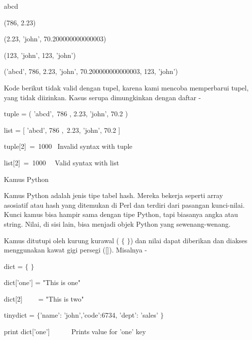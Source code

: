 abcd \par
\noindent 
(786, 2.23) \par
\noindent 
(2.23, 'john', 70.200000000000003) \par
\noindent 
(123, 'john', 123, 'john') \par
\noindent 
('abcd', 786, 2.23, 'john', 70.200000000000003, 123, 'john') \par
\vspace{12pt}
\noindent 
Kode berikut tidak valid dengan tupel, karena kami mencoba memperbarui tupel, yang tidak diizinkan. $  $Kasus serupa dimungkinkan dengan daftar - \par
\vspace{12pt}
\noindent 
tuple = ( 'abcd',~786 , 2.23, 'john', 70.2  ) \par
\noindent 
list = [ 'abcd', 786 ,~2.23, 'john', 70.2  ] \par
\noindent 
tuple[2]~=~1000~    Invalid syntax with tuple \par
\noindent 
list[2]~=~1000~~    Valid syntax with list \par
\vspace{12pt}
\noindent 
Kamus Python \par
\vspace{12pt}
\noindent 
Kamus Python adalah jenis tipe tabel hash. $  $Mereka bekerja seperti array asosiatif atau hash yang ditemukan di Perl dan terdiri dari pasangan kunci-nilai. $  $Kunci kamus bisa hampir sama dengan tipe Python, tapi biasanya angka atau string. $  $Nilai, di sisi lain, bisa menjadi objek Python yang sewenang-wenang. \par
\vspace{12pt}
\noindent 
Kamus ditutupi oleh kurung kurawal ( $  \{  $ $  \}  $) dan nilai dapat diberikan dan diakses menggunakan kawat gigi persegi ([]). $  $Misalnya - \par
\vspace{12pt}
\vspace{12pt}
\noindent 
dict =  $  \{  $ $  \}  $ \par
\noindent 
dict['one'] = "This is one" \par
\noindent 
dict[2]~~~~ = "This is two" \par
\vspace{12pt}
\noindent 
tinydict =  $  \{  $'name': 'john','code':6734, 'dept': 'sales' $  \}  $ \par
\vspace{12pt}
\vspace{12pt}
\noindent 
print dict['one']~~ ~~~  Prints value for 'one' key \par
